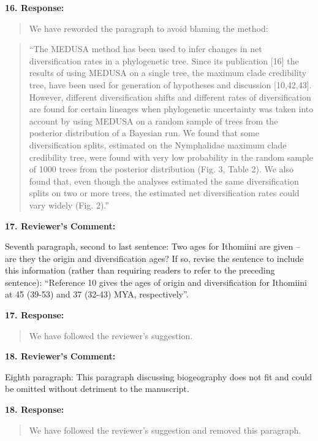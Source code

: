 \documentclass[]{article}
\begin{document}
\textbf{16. Response:}

\begin{quote}
\color{blue}
We have reworded the paragraph to avoid blaming the method:
\end{quote}

\begin{quote}
\color{blue}
``The MEDUSA method has been used to infer changes in net
diversification rates in a phylogenetic tree. Since its publication
{[}16{]} the results of using MEDUSA on a single tree, the maximum clade
credibility tree, have been used for generation of hypotheses and
discussion {[}10,42,43{]}. However, different diversification shifts and
different rates of diversification are found for certain lineages when
phylogenetic uncertainty was taken into account by using MEDUSA on a
random sample of trees from the posterior distribution of a Bayesian
run. We found that some diversification splits, estimated on the
Nymphalidae maximum clade credibility tree, were found with very low
probability in the random sample of 1000 trees from the posterior
distribution (Fig. 3, Table 2). We also found that, even though the
analyses estimated the same diversification splits on two or more trees,
the estimated net diversification rates could vary widely (Fig. 2).''
\end{quote}

\textbf{17. Reviewer's Comment:}

Seventh paragraph, second to last sentence: Two ages for Ithomiini are
given -- are they the origin and diversification ages? If so, revise the
sentence to include this information (rather than requiring readers to
refer to the preceding sentence): ``Reference 10 gives the ages of
origin and diversification for Ithomiini at 45 (39-53) and 37 (32-43)
MYA, respectively''.

\textbf{17. Response:}

\begin{quote}
\color{blue}
We have followed the reviewer's suggestion.
\end{quote}

\textbf{18. Reviewer's Comment:}

Eighth paragraph: This paragraph discussing biogeography does not fit
and could be omitted without detriment to the manuscript.

\textbf{18. Response:}

\begin{quote}
\color{blue}
We have followed the reviewer's suggestion and removed this paragraph.
\end{quote}
\end{document}
